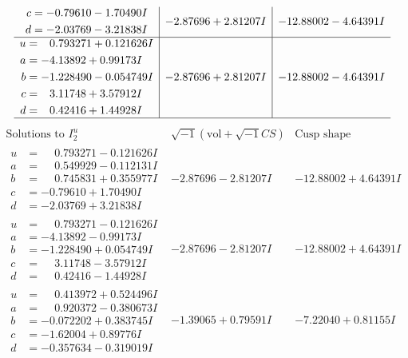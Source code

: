 \documentclass[1p]{elsarticle_modified}
\theoremstyle{definition}
\newcommand{\I}{\sqrt{-1}}
\begin{document}
$$\begin{array}{c|c|c}
\begin{aligned}
c &= -0.79610 - 1.70490 I \\
d &= -2.03769 - 3.21838 I\end{aligned}
 & -2.87696 + 2.81207 I & -12.88002 - 4.64391 I \\ \hline\begin{aligned}
u &= \phantom{-}0.793271 + 0.121626 I \\
a &= -4.13892 + 0.99173 I \\
b &= -1.228490 - 0.054749 I \\
c &= \phantom{-}3.11748 + 3.57912 I \\
d &= \phantom{-}0.42416 + 1.44928 I\end{aligned}
 & -2.87696 + 2.81207 I & -12.88002 - 4.64391 I\\
 \hline 
 \end{array}$$\newpage$$\begin{array}{c|c|c}  
\text{Solutions to }I^u_{2}& \I (\text{vol} + \sqrt{-1}CS) & \text{Cusp shape}\\
 \hline 
\begin{aligned}
u &= \phantom{-}0.793271 - 0.121626 I \\
a &= \phantom{-}0.549929 - 0.112131 I \\
b &= \phantom{-}0.745831 + 0.355977 I \\
c &= -0.79610 + 1.70490 I \\
d &= -2.03769 + 3.21838 I\end{aligned}
 & -2.87696 - 2.81207 I & -12.88002 + 4.64391 I \\ \hline\begin{aligned}
u &= \phantom{-}0.793271 - 0.121626 I \\
a &= -4.13892 - 0.99173 I \\
b &= -1.228490 + 0.054749 I \\
c &= \phantom{-}3.11748 - 3.57912 I \\
d &= \phantom{-}0.42416 - 1.44928 I\end{aligned}
 & -2.87696 - 2.81207 I & -12.88002 + 4.64391 I \\ \hline\begin{aligned}
u &= \phantom{-}0.413972 + 0.524496 I \\
a &= \phantom{-}0.920372 - 0.380673 I \\
b &= -0.072202 + 0.383745 I \\
c &= -1.62004 + 0.89776 I \\
d &= -0.357634 - 0.319019 I\end{aligned}
 & -1.39065 + 0.79591 I & -7.22040 + 0.81155 I \\ \hline\begin{aligned}

\end{aligned}
\end{array}$$
\end{document}

